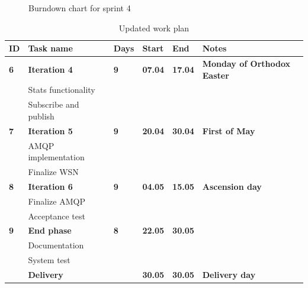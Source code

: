 \begin{center}
  \begin{figure}[ht!]
    \caption{Burndown chart for sprint 4}
    \label{fig:sprint 4, burndown}
  \end{figure}
\end{center}


\begin{center}
\begin{table}[ht!]
\centering
\small
\begin{tabular}{ | m{0.4cm} | m{3.3cm}| m{0.7cm} | m{0.9cm} | m{0.9cm}| m{4.4cm} |} 
\hline
\rowcolor{lightgray}
\textbf{ID} & \textbf{Task name} & \textbf{Days} & \textbf{Start} & \textbf{End} & \textbf{Notes} \\
\hline
\textbf{6} & \textbf{Iteration 4} & \textbf{9} & \textbf{07.04} & \textbf{17.04} & \textbf{Monday of Orthodox Easter} \\
 & Stats functionality & & & & \\
 & Subscribe and publish  & & & & \\
\hline
\textbf{7} & \textbf{Iteration 5} & \textbf{9} & \textbf{20.04} & \textbf{30.04} & \textbf{First of May} \\
 & AMQP implementation & & & & \\
 & Finalize WSN & & & & \\
\hline 
\textbf{8} & \textbf{Iteration 6} & \textbf{9} & \textbf{04.05} & \textbf{15.05} & \textbf{Ascension day} \\
 & Finalize AMQP & & & & \\
 & Acceptance test & & & & \\
\hline
\textbf{9} & \textbf{End phase} & \textbf{8} & \textbf{22.05} & \textbf{30.05} & \\
 & Documentation & & & & \\
 & System test & & & & \\
 & \textbf{Delivery} & & \textbf{30.05} & \textbf{30.05} & \textbf{Delivery day} \\
\hline
\end{tabular}
\caption{Updated work plan}
\label{tab:workplan, revised}
\end{table}
\end{center}


